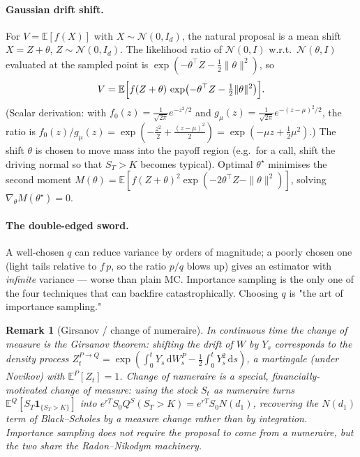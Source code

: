 \documentclass[11pt]{article}
\newcommand{\E}{\mathbb{E}}
\newcommand{\dd}{\,\mathrm{d}}
\newtheorem{remark}{Remark}
\begin{document}
\paragraph{Gaussian drift shift.} For $V=\E[f(X)]$ with $X\sim\mathcal N(0,I_d)$, the
natural proposal is a mean shift $X=Z+\theta$, $Z\sim\mathcal N(0,I_d)$. The
likelihood ratio of $\mathcal N(0,I)$ w.r.t.\ $\mathcal N(\theta,I)$ evaluated at the
sampled point is $\exp(-\theta^\top Z-\tfrac12\|\theta\|^2)$, so
\[
V=\E\Bigl[f(Z+\theta)\,\exp\bigl(-\theta^\top Z-\tfrac12\|\theta\|^2\bigr)\Bigr].
\]
(Scalar derivation: with $f_{0}(z)=\tfrac1{\sqrt{2\pi}}e^{-z^2/2}$ and
$g_\mu(z)=\tfrac1{\sqrt{2\pi}}e^{-(z-\mu)^2/2}$, the ratio is
$f_0(z)/g_\mu(z)=\exp(-\tfrac{z^2}2+\tfrac{(z-\mu)^2}2)=\exp(-\mu z+\tfrac12\mu^2)$.) The
shift $\theta$ is chosen to move mass into the payoff region (e.g.\ for a call, shift the
driving normal so that $S_T>K$ becomes typical). Optimal $\theta^\star$ minimises the
second moment
$M(\theta)=\E[f(Z+\theta)^2\exp(-2\theta^\top Z-\|\theta\|^2)]$, solving
$\nabla_\theta M(\theta^\star)=0$.

\paragraph{The double-edged sword.} A well-chosen $q$ can reduce variance by orders of
magnitude; a poorly chosen one (light tails relative to $f\,p$, so the ratio
$p/q$ blows up) gives an estimator with \emph{infinite} variance --- worse than plain
MC. Importance sampling is the only one of the four techniques that can backfire
catastrophically. Choosing $q$ is "the art of importance sampling."

\begin{remark}[Girsanov / change of numeraire]
In continuous time the change of measure is the Girsanov theorem: shifting the drift of
$W$ by $Y_s$ corresponds to the density process $Z_t^{P\to Q}=\exp(\int_0^t Y_s\dd
W_s^P-\tfrac12\int_0^t Y_s^2\dd s)$, a martingale (under Novikov) with $\E^P[Z_t]=1$.
\emph{Change of numeraire} is a special, financially-motivated change of measure: using
the stock $S_t$ as numeraire turns $\E^Q[S_T\mathbf 1_{\{S_T>K\}}]$ into $e^{rT}S_0
Q^S(S_T>K)=e^{rT}S_0 N(d_1)$, recovering the $N(d_1)$ term of Black--Scholes by a measure
change rather than by integration. Importance sampling does not require the proposal to
come from a numeraire, but the two share the Radon--Nikodym machinery.
\end{remark}

\end{document}
